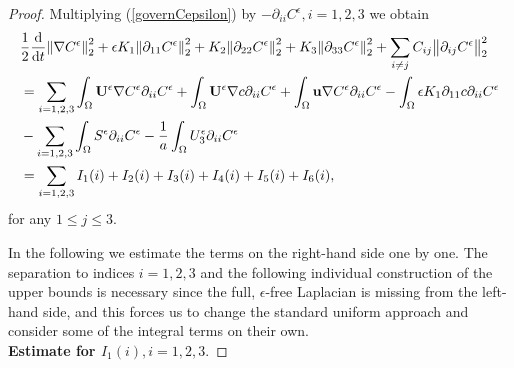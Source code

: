 \documentclass[11pt, a4paper]{article}
\newcommand*\diff{\mathop{}\!\mathrm{d}}
\begin{document}
\begin{proof}
Multiplying (\ref{governCepsilon}) by $- \partial_{ii} C^\epsilon, i=1,2,3$ we obtain
%
\begin{equation}
\begin{split}
& \frac{1}{2}\frac{\diff}{\diff t} \norm{\nabla C^\epsilon}_2^2 + \epsilon K_1 \norm{\partial_{11} C^\epsilon}_2^2 + K_2 \norm{\partial_{22} C^\epsilon}_2^2 + K_3 \norm{\partial_{33} C^\epsilon}_2^2 + \sum_{i \neq j} C_{ij} \norm{\partial_{ij} C^\epsilon}_2^2 \\
& = \sum_{i = 1,2,3} \int_\Omega \mathbf{U}^\epsilon \nabla C^\epsilon \partial_{ii} C^\epsilon + \int_\Omega \mathbf{U}^\epsilon \nabla c \partial_{ii} C^\epsilon + \int_\Omega \mathbf{u} \nabla C^\epsilon \partial_{ii} C^\epsilon - \int_\Omega \epsilon K_1 \partial_{11} c \partial_{ii} C^\epsilon \\
& - \sum_{i = 1,2,3} \int_\Omega S^\epsilon \partial_{ii} C^\epsilon - \frac{1}{a} \int_\Omega U_3^\epsilon \partial_{ii} C^\epsilon \\
& = \sum_{i = 1,2,3} I_1(i) + I_2(i) + I_3(i) + I_4(i) + I_5(i) + I_6(i),
\end{split}
\end{equation}
%
for any $1 \leq j \leq 3.$

In the following we estimate the terms on the right-hand side one by one. The separation to indices $i = 1,2,3$ and the following individual construction of the upper bounds is necessary since the full, $\epsilon$-free Laplacian is missing from the left-hand side, and this forces us to change the standard uniform approach and consider some of the integral terms on their own.\\[0.5cm]
\textbf{Estimate for $I_1(i), i = 1,2,3.$}


\end{proof}
\end{document}
